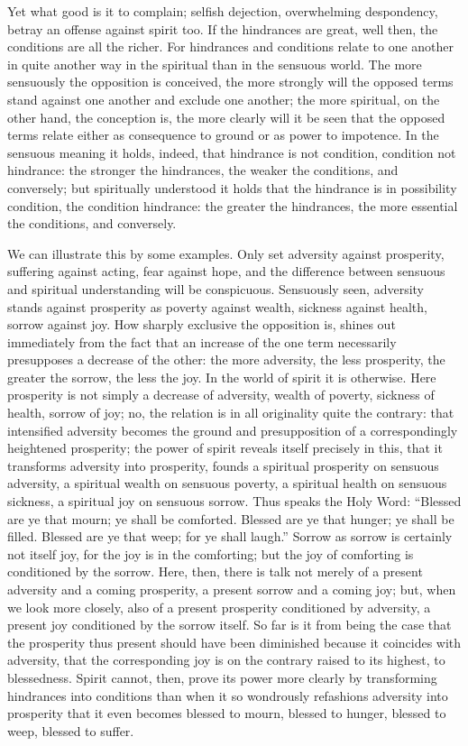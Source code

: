 \documentclass[12pt]{book}
\newcommand{\opage}[1]{\marginnote{\footnotesize\textit{[#1]}}}
\begin{document}
Yet what good is it to complain; selfish dejection, overwhelming
despondency, betray an offense against spirit too. If the hindrances are
great, well then, the conditions are all the richer. For hindrances and
conditions relate to one another in quite another way in the spiritual
than in the sensuous world. The more sensuously the opposition is
conceived, the more strongly will the opposed terms stand against one
another and exclude one another; the more spiritual, on the other hand,
the conception is, the more clearly will it be seen that the opposed
terms relate either as consequence to ground or as power to impotence.
In the sensuous meaning it holds, indeed, that hindrance is not
condition, condition not hindrance: the stronger the hindrances, the
weaker the conditions, and conversely; but spiritually understood it
holds that the hindrance is in possibility condition, the condition
hindrance: the greater the hindrances, the more essential the
conditions, and conversely.

We can illustrate this by some examples. Only set adversity against
prosperity, suffering against acting, fear against hope, and the
difference between sensuous and spiritual understanding will be
conspicuous. Sensuously seen, adversity stands against prosperity as
poverty against wealth, sickness against health, sorrow against joy. How
sharply exclusive the opposition is, shines out immediately from the
fact that an increase of the one term necessarily presupposes a decrease
of the other: the more adversity, the less prosperity, the greater the
sorrow,
\opage{7}\setcounter{footnote}{0}%
the less the joy. In the world of spirit it is otherwise. Here
prosperity is not simply a decrease of adversity, wealth of poverty,
sickness of health, sorrow of joy; no, the relation is in all
originality quite the contrary: that intensified adversity becomes the
ground and presupposition of a correspondingly heightened prosperity;
the power of spirit reveals itself precisely in this, that it transforms
adversity into prosperity, founds a spiritual prosperity on sensuous
adversity, a spiritual wealth on sensuous poverty, a spiritual health on
sensuous sickness, a spiritual joy on sensuous sorrow. Thus speaks the
Holy Word: ``Blessed are ye that mourn; ye shall be comforted. Blessed
are ye that hunger; ye shall be filled. Blessed are ye that weep; for ye
shall laugh.'' Sorrow as sorrow is certainly not itself joy, for the joy
is in the comforting; but the joy of comforting is conditioned by the
sorrow. Here, then, there is talk not merely of a present adversity and
a coming prosperity, a present sorrow and a coming joy; but, when we
look more closely, also of a present prosperity conditioned by
adversity, a present joy conditioned by the sorrow itself. So far is it
from being the case that the prosperity thus present should have been
diminished because it coincides with adversity, that the corresponding
joy is on the contrary raised to its highest, to blessedness. Spirit
cannot, then, prove its power more clearly by transforming hindrances
into conditions than when it so wondrously refashions adversity into
prosperity that it even becomes blessed to mourn, blessed to hunger,
blessed to weep, blessed to suffer.
\end{document}
